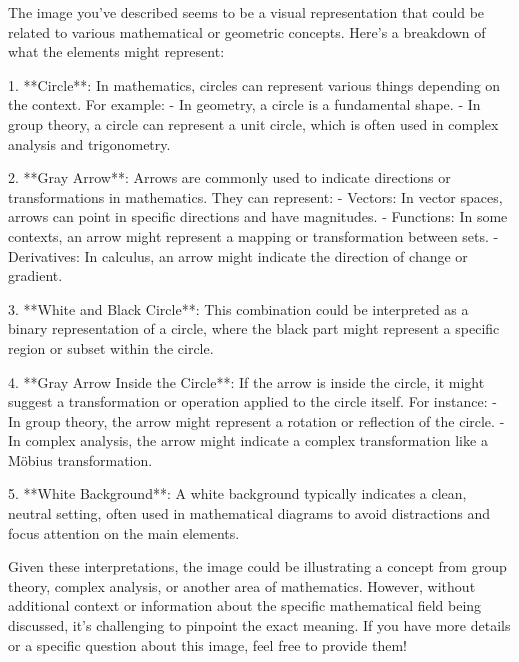 The image you've described seems to be a visual representation that could be related to various mathematical or geometric concepts. Here's a breakdown of what the elements might represent:

1. **Circle**: In mathematics, circles can represent various things depending on the context. For example:
   - In geometry, a circle is a fundamental shape.
   - In group theory, a circle can represent a unit circle, which is often used in complex analysis and trigonometry.

2. **Gray Arrow**: Arrows are commonly used to indicate directions or transformations in mathematics. They can represent:
   - Vectors: In vector spaces, arrows can point in specific directions and have magnitudes.
   - Functions: In some contexts, an arrow might represent a mapping or transformation between sets.
   - Derivatives: In calculus, an arrow might indicate the direction of change or gradient.

3. **White and Black Circle**: This combination could be interpreted as a binary representation of a circle, where the black part might represent a specific region or subset within the circle.

4. **Gray Arrow Inside the Circle**: If the arrow is inside the circle, it might suggest a transformation or operation applied to the circle itself. For instance:
   - In group theory, the arrow might represent a rotation or reflection of the circle.
   - In complex analysis, the arrow might indicate a complex transformation like a Möbius transformation.

5. **White Background**: A white background typically indicates a clean, neutral setting, often used in mathematical diagrams to avoid distractions and focus attention on the main elements.

Given these interpretations, the image could be illustrating a concept from group theory, complex analysis, or another area of mathematics. However, without additional context or information about the specific mathematical field being discussed, it's challenging to pinpoint the exact meaning. If you have more details or a specific question about this image, feel free to provide them!